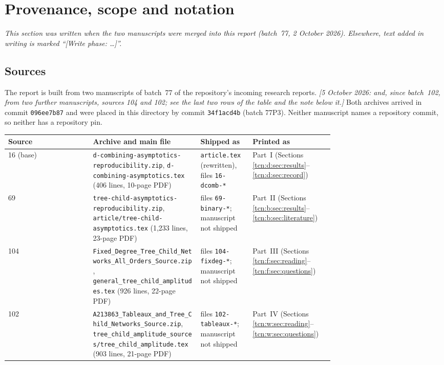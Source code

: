 \documentclass[11pt,letterpaper]{article}
\theoremstyle{remark}
\begin{document}
\section{Provenance, scope and notation}\label{tcn:sec:provenance}
\emph{This section was written when the two manuscripts were merged into this report (batch~77, 2 October 2026). Elsewhere, text added in writing is marked ``[Write phase: \dots]''.}

\subsection{Sources}\label{tcn:sec:sources}
The report is built from two manuscripts of batch~77 of the repository's incoming research reports. \emph{[5 October 2026: and, since batch~102, from two further manuscripts, sources 104 and 102; see the last two rows of the table and the note below it.]} Both archives arrived in commit \texttt{096ee7b87} and were placed in this directory by commit \texttt{34f1acd4b} (batch 77P3). Neither manuscript names a repository commit, so neither has a repository pin.

\begin{center}\small
\begin{tabular}{@{}l>{\raggedright}p{0.33\linewidth}>{\raggedright}p{0.16\linewidth}>{\raggedright\arraybackslash}p{0.25\linewidth}@{}}
\toprule
Source & Archive and main file & Shipped as & Printed as\\
\midrule
16 (base) & \textup{\nolinkurl{d-combining-asymptotics-reproducibility.zip}}, \textup{\nolinkurl{d-combining-asymptotics.tex}} (406 lines, 10-page PDF) & \textup{\nolinkurl{article.tex}} (rewritten), files \textup{\nolinkurl{16-dcomb-*}} & Part~I (Sections \ref{tcn:d:sec:results}--\ref{tcn:d:sec:record})\\
69 & \textup{\nolinkurl{tree-child-asymptotics-reproducibility.zip}}, \textup{\nolinkurl{article/tree-child-asymptotics.tex}} (1,233 lines, 23-page PDF) & files \textup{\nolinkurl{69-binary-*}}; manuscript not shipped & Part~II (Sections \ref{tcn:b:sec:results}--\ref{tcn:b:sec:literature})\\
104 & \textup{\nolinkurl{Fixed_Degree_Tree_Child_Networks_All_Orders_Source.zip}}, \textup{\nolinkurl{general_tree_child_amplitudes.tex}} (926 lines, 22-page PDF) & files \textup{\nolinkurl{104-fixdeg-*}}; manuscript not shipped & Part~III (Sections \ref{tcn:f:sec:reading}--\ref{tcn:f:sec:questions})\\
102 & \textup{\nolinkurl{A213863_Tableaux_and_Tree_Child_Networks_Source.zip}}, \textup{\nolinkurl{tree_child_amplitude_sources/tree_child_amplitude.tex}} (903 lines, 21-page PDF) & files \textup{\nolinkurl{102-tableaux-*}}; manuscript not shipped & Part~IV (Sections \ref{tcn:w:sec:reading}--\ref{tcn:w:sec:questions})\\
\bottomrule
\end{tabular}
\end{center}
\end{document}

